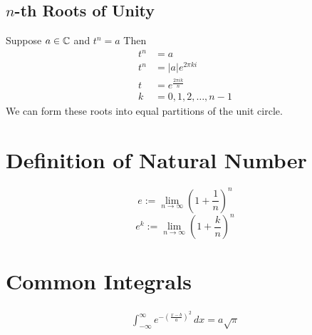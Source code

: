 \documentclass[11pt]{article}
\begin{document}
\subsection{$n$-th Roots of Unity}
Suppose $a \in \mathbb{C}$ and $t^n = a$
Then 
\begin{align*}
	t^n &= a\\
	t^n &= |a|e^{2\pi ki}\\
	t &= e^\frac{2\pi ik}{n}\\
	k &= 0, 1, 2, \hdots, n-1
\end{align*}
We can form these roots into equal partitions of the unit circle.


\section{Definition of Natural Number}
$$e:= \underset{n \rightarrow \infty}{\lim} (1 + \frac{1}{n})^n$$
$$e^k:= \underset{n \rightarrow \infty}{\lim} (1 + \frac{k}{n})^n$$

\section{Common Integrals}
\begin{align}
	\int_{-\infty}^\infty e^{-(\frac{x-b}{a})^2} \, dx = a\sqrt{\pi}
\end{align}
\end{document}
